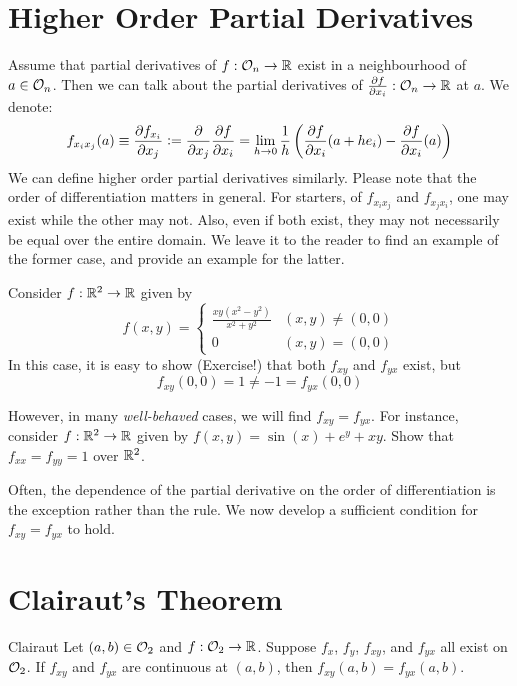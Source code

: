 \documentclass[../Analysis-3.tex]{subfiles}
\begin{document}
\section{Higher Order Partial Derivatives}

Assume that partial derivatives of $f: \mathcal{O}_{n} \to \mathbb{R}$ exist in a neighbourhood of $a \in \mathcal{O}_{n} $. Then we can talk about the partial derivatives of $\pdv{f}{x_i}: \mathcal{O}_{n} \to \mathbb{R}$ at $a$. We denote:
\[f_{x_i x_j}(a) \equiv \pdv{f_{x_i}}{x_j} \mathrel{\mathop:}= \pdv{x_j} \pdv{f}{x_i} = \lim_{h \to 0} \frac{1}{h} \left( \pdv{f}{x_i}\/(a+h e_i)- \pdv{f}{x_i}\/ (a) \right)
\]
We can define higher order partial derivatives similarly. Please note that the order of differentiation matters in general. For starters, of  $f_{x_i x_j}$ and $f_{x_j x_i}$, one may exist while the other may not. Also, even if both exist, they may not necessarily be equal over the entire domain. We leave it to the reader to find an example of the former case, and provide an example for the latter.

\begin{Eg}{}{}
  Consider $f: \mathbb{R}^2 \to \mathbb{R}$ given by
  \[
    f(x,y) =
    \begin{cases}
      \frac{xy(x^2 - y^2)}{x^2 + y^2} & (x,y) \neq (0,0) \\
      0                               & (x,y) = (0,0)
    \end{cases}
  \]
  In this case, it is easy to show (Exercise!) that both $f_{xy}$ and $f_{yx}$ exist, but
  \[f_{xy}(0,0) = 1 \neq -1 = f_{yx}(0,0)\]
\end{Eg}

\begin{Eg}{}{}
  However, in many \emph{well-behaved} cases, we will find $f_{xy} = f_{yx}$.
  For instance, consider $f: \mathbb{R}^2 \to \mathbb{R}$ given by $f(x,y) = \sin(x) + e^y + xy$. Show that $f_{xx} = f_{yy} = 1$ over $\mathbb{R}^2$.
\end{Eg}

Often, the dependence of the partial derivative on the order of differentiation is the exception rather than the rule. We now develop a sufficient condition for $f_{xy} = f_{yx}$ to hold.

\section{Clairaut's Theorem}

\begin{Thm}{Clairaut}{}\label{thm1:19}
  Let $(a,b) \in \mathcal{O}_{2}$ and $f:\mathcal{O}_{2} \to \mathbb{R}$. Suppose $f_x$, $f_y$, $f_{xy}$, and $f_{yx}$ all exist on $\mathcal{O}_{2}$. If $f_{xy}$ and $f_{yx}$ are continuous at $(a,b)$, then $f_{xy}(a,b) = f_{yx}(a,b)$.
\end{Thm}
\end{document}
